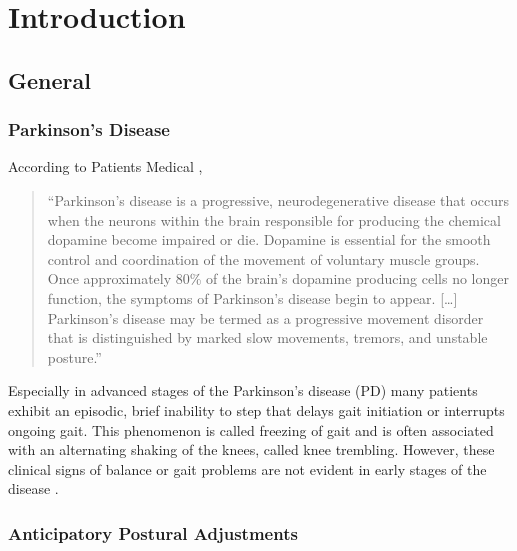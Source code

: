 \chapter{Introduction}
\label{ch:Introduction}

\section{General}

\subsection{Parkinson's Disease}

According to Patients Medical \cite{patients_medical_definition_2014}, \begin{quote}``Parkinson's disease is a progressive, neurodegenerative disease that occurs when the neurons within the brain responsible for producing the chemical dopamine become impaired or die. Dopamine is essential for the smooth control and coordination of the movement of voluntary muscle groups. Once approximately 80\% of the brain's dopamine producing cells no longer function, the symptoms of Parkinson's disease begin to appear. [\dots] Parkinson's disease may be termed as a progressive movement disorder that is distinguished by marked slow movements, tremors, and unstable posture.''\end{quote}

Especially in advanced stages of the Parkinson's disease (PD) many patients exhibit an episodic, brief inability to step that delays gait initiation or interrupts ongoing gait. This phenomenon is called freezing of gait and is often associated with an alternating shaking of the knees, called knee trembling. However, these clinical signs of balance or gait problems are not evident in early stages of the disease \cite{mancini_anticipatory_2009}\cite{jacobs_knee_2009}.

\subsection{Anticipatory Postural Adjustments}

